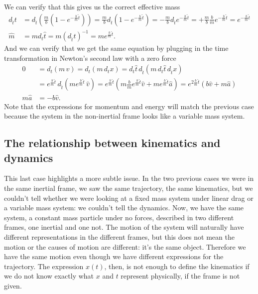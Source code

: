 We can verify that this gives us the correct effective mass
\begin{equation}
	\begin{aligned}
	d_{\hat{t}} t  &=d_{\hat{t}} \left( \frac{m}{b} (1-e^{-\frac{b}{m}\hat{t}}) \right) =\frac{m}{b} d_{\hat{t}} (1-e^{-\frac{b}{m}\hat{t}}) = - \frac{m}{b} d_{\hat{t}} e^{-\frac{b}{m}\hat{t}} = + \frac{m}{b} \frac{b}{m} e^{-\frac{b}{m}\hat{t}} = e^{-\frac{b}{m}\hat{t}} \\
	\hat{m} &= m d_t \hat{t} = m (d_{\hat{t}} t)^{-1} = m e^{\frac{b}{m}\hat{t}}.
	\end{aligned}
\end{equation}
And we can verify that we get the same equation by plugging in the time transformation in Newton's second law with a zero force
\begin{equation}
	\begin{aligned}
		0 &= d_t  (m \, v) = d_t  (m \, d_t x) = d_t \hat{t} \, d_{\hat{t}}  (m \, d_t \hat{t} \, d_{\hat{t}} x) \\ &= e^{\frac{b}{m}\hat{t}} \, d_{\hat{t}}  (m e^{\frac{b}{m}\hat{t}} \, \hat{v}) = e^{\frac{b}{m}\hat{t}} \left( m \frac{b}{m} e^{\frac{b}{m}\hat{t}} \hat{v} + m e^{\frac{b}{m}\hat{t}} \hat{a} \right)  = e^{2\frac{b}{m}\hat{t}} \left( b \hat{v} + m \hat{a} \right) \\
		m \hat{a} &= - b \hat{v}.
	\end{aligned}
\end{equation}
Note that the expressions for momentum and energy will match the previous case because the system in the non-inertial frame looks like a variable mass system.

\subsection{The relationship between kinematics and dynamics}


This last case highlights a more subtle issue. In the two previous cases we were in the same inertial frame, we saw the same trajectory, the same kinematics, but we couldn't tell whether we were looking at a fixed mass system under linear drag or a variable mass system: we couldn't tell the dynamics. Now, we have the same system, a constant mass particle under no forces, described in two different frames, one inertial and one not. The motion of the system will naturally have different representations in the different frames, but this does not mean the motion or the causes of motion are different: it's the same object. Therefore we have the same motion even though we have different expressions for the trajectory. The expression $x(t)$, then, is not enough to define the kinematics if we do not know exactly what $x$ and $t$ represent physically, if the frame is not given.

